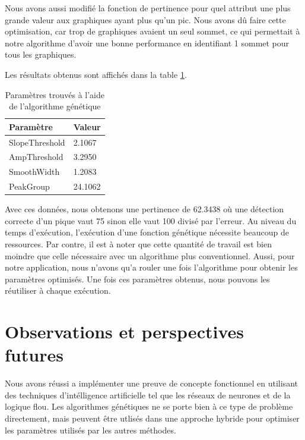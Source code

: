 \documentclass[12pt,letterpaper]{article}
\begin{document}
Nous avons aussi modifié la fonction de pertinence pour quel attribut une plus grande valeur aux graphiques ayant plus qu’un pic.
Nous avons dû faire cette optimisation, car trop de graphiques avaient un seul sommet, ce qui permettait à notre algorithme d'avoir une bonne
performance en identifiant 1 sommet pour tous les graphiques.

Les résultats obtenus sont affichés dans la table \ref{tab:genparam}.

\begin{table}[h]
  \begin{center}
    \begin{tabular} {|l|l|}
        \hline
        \bf{Paramètre} & \bf{Valeur} \\
        \hline
        SlopeThreshold & 2.1067 \\
        \hline
        AmpThreshold & 3.2950 \\
        \hline
        SmoothWidth & 1.2083 \\
        \hline
        PeakGroup & 24.1062 \\
        \hline
    \end{tabular}
    \caption{Paramètres trouvés à l'aide de l'algorithme génétique}
    \label{tab:genparam}
  \end{center}
\end{table}

Avec ces données, nous obtenons une pertinence de 62.3438 où une détection correcte d'un pique vaut 75 sinon elle vaut 100 divisé par l'erreur.
Au niveau du temps d'exécution, l'exécution d'une fonction génétique nécessite beaucoup de ressources. Par contre, il est à noter que
cette quantité de travail est bien moindre que celle nécessaire avec un algorithme plus conventionnel. Aussi, pour notre application, nous n'avons
qu'a rouler une fois l'algorithme pour obtenir les paramètres optimisés. Une fois ces paramètres obtenus, nous pouvons les réutiliser à chaque exécution.

\section{Observations et perspectives futures}

Nous avons réussi a implémenter une preuve de concepte fonctionnel en utilisant des techniques d'intélligence artificielle tel que les réseaux de neurones et de la logique flou. Les algorithmes génétiques ne se porte bien à ce type de problème directement, mais peuvent être utlisés dans une approche hybride pour optimiser les paramètres utilisés par les autres méthodes. 
\end{document}
